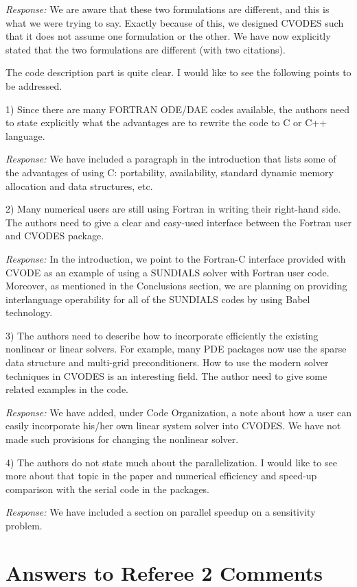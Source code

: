{\em Response:}
We are aware that these two formulations are different, and this is
what we were trying to say. Exactly because of this, we designed
CVODES such that it does not assume one formulation or the other.  We
have now explicitly stated that the two formulations are different
(with two citations).

The code description part is quite clear. I would like to see
the following points to be addressed. 

1) Since there are many FORTRAN ODE/DAE codes available, the authors need to 
state explicitly what the advantages are to rewrite the code to C or C++
language. 

{\em Response:}
We have included a paragraph in the introduction that lists
some of the advantages of using C: portability, availability, standard
dynamic memory allocation and data structures, etc.

2) Many numerical users are still using Fortran in writing their right-hand 
side. The authors need to give a clear and easy-used interface between the 
Fortran user and CVODES package. 

{\em Response:}
In the introduction, we point to the Fortran-C interface provided
with CVODE as an example of using a SUNDIALS solver with Fortran user code.
Moreover, as mentioned in the Conclusions section, we are planning on
providing interlanguage operability for all of the SUNDIALS codes by using
Babel technology.

3) The authors need to describe how to incorporate efficiently the existing 
nonlinear or linear solvers. For example, many PDE packages now use the sparse 
data structure and multi-grid preconditioners. How to use the modern solver
techniques  in CVODES is an interesting field. The author need
to give some related examples in the code. 

{\em Response:}
We have added, under Code Organization, a note about how a user can
easily incorporate his/her own linear system solver into CVODES.  We
have not made such provisions for changing the nonlinear solver.

4) The authors do not state much about the parallelization. I would like to 
see more about that topic in the paper and numerical efficiency and speed-up
comparison with the serial code in the packages.

{\em Response:}
We have included a section on parallel speedup on a sensitivity problem.


\newpage
\section{Answers to Referee 2 Comments}


